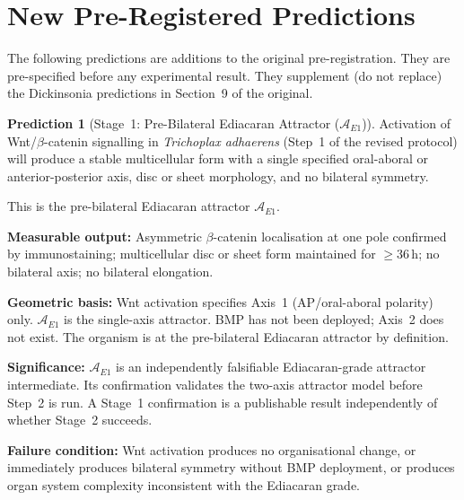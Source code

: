 \documentclass[12pt, a4paper]{article}
\theoremstyle{definition}
\newtheorem{prediction}{Prediction}[section]
\theoremstyle{remark}
\begin{document}
\section{New Pre-Registered Predictions}

The following predictions are additions to the original
pre-registration. They are pre-specified before any
experimental result. They supplement (do not replace) the
Dickinsonia predictions in Section~9 of the original.

\begin{prediction}[Stage~1: Pre-Bilateral Ediacaran
Attractor ($\mathcal{A}_{E1}$)]
\label{pred:e1}
Activation of Wnt/$\beta$-catenin signalling in
\textit{Trichoplax adhaerens} (Step~1 of the revised
protocol) will produce a stable multicellular form with a
single specified oral-aboral or anterior-posterior axis,
disc or sheet morphology, and no bilateral symmetry.

This is the pre-bilateral Ediacaran attractor
$\mathcal{A}_{E1}$.

\textbf{Measurable output:} Asymmetric $\beta$-catenin
localisation at one pole confirmed by immunostaining;
multicellular disc or sheet form maintained for
$\geq$36\,h; no bilateral axis; no bilateral elongation.

\textbf{Geometric basis:} Wnt activation specifies Axis~1
(AP/oral-aboral polarity) only. $\mathcal{A}_{E1}$ is
the single-axis attractor. BMP has not been deployed;
Axis~2 does not exist. The organism is at the
pre-bilateral Ediacaran attractor by definition.

\textbf{Significance:} $\mathcal{A}_{E1}$ is an
independently falsifiable Ediacaran-grade attractor
intermediate. Its confirmation validates the two-axis
attractor model before Step~2 is run. A Stage~1
confirmation is a publishable result independently of
whether Stage~2 succeeds.

\textbf{Failure condition:} Wnt activation produces no
organisational change, or immediately produces bilateral
symmetry without BMP deployment, or produces organ system
complexity inconsistent with the Ediacaran grade.
\end{prediction}
\end{document}
